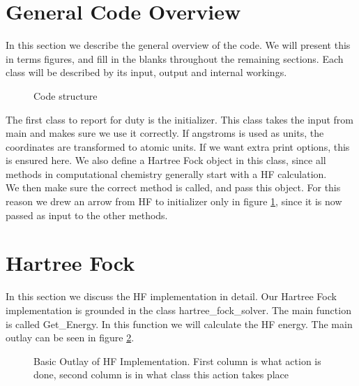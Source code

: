 \documentclass[a4paper,norsk,11pt,twoside]{report}
\begin{document}
\section{General Code Overview}
In this section we describe the general overview of the code. We will
present this in terms figures, and fill in the blanks throughout the
remaining sections. Each class will be described by its input, output
and internal workings. \\

\begin{figure}[h!]
\begin{center}
\caption{Code structure}
\label{fig:structure}
\end{center}
\end{figure}

The first class to report for duty is the initializer. This class
takes the input from main and makes sure we use it correctly. If
angstroms is used as units, the coordinates are transformed to atomic
units. If we want extra print options, this is ensured here. We also
define a Hartree Fock object in this class, since all methods in
computational chemistry generally start with a HF calculation. \\

We then make sure the correct method is called, and pass this
object. For this reason we drew an arrow from HF to initializer only
in figure \ref{fig:structure}, since it is now passed as input to the
other methods.


\section{Hartree Fock}
In this section we discuss the HF implementation in detail. Our
Hartree Fock implementation is grounded in the class
hartree\_fock\_solver. The main function is called Get\_Energy. In
this function we will calculate the HF energy. The main outlay can be
seen in figure \ref{fig:hfimp}. \\

\begin{figure}[h!]
\begin{center}
\caption{Basic Outlay of HF Implementation. First column is what action is done, second column is in what class this action takes place}
\label{fig:hfimp}
\end{center}
\end{figure}
\end{document}
